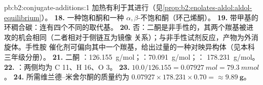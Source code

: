 \begin{solution}{pb:b2:conjugate-additions:1}
加热有利于其进行（见\cref{prop:b2:enolates-aldol:aldol-equilibrium}）。
\textbf{18.} 一种饱和酮和一种 $\alpha,\beta$-不饱和酮（环己烯酮）。
\textbf{19.} 带甲基的环稠合碳：连有四个不同的取代基。
\textbf{20.} 否：二酮是非手性的，其两个羰基被进攻的机会相同（二者相对于侧链互为镜像
关系）；与非手性试剂反应，产物为外消旋体。手性胺
催化剂可偏向其中一个羰基，给出过量的一种对映异构体（见本科三年级分册）。
\textbf{21.} 二酮 ：\qty{126.155}{g/mol}；：\qty{70.091}{g/mol}；：
\qty{178.231}{g/mol}。
\textbf{22.} ：两侧均为 C 11、H 16、O 3。
\textbf{23.} $10.0/126.155 = \qty{0.07927}{mol} = \qty{79.3}{mmol}$。
\textbf{24.} 所需维兰德–米舍尔酮的质量约为
$0.07927 \times 178.231 \times 0.70 = \boldsymbol{\approx \qty{9.89}{g}}$。
\end{solution}

